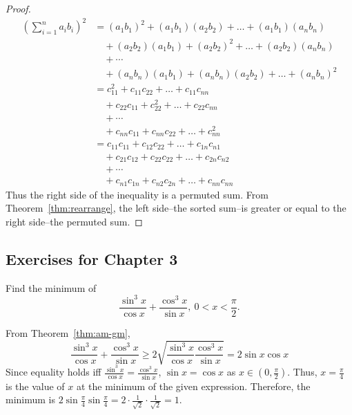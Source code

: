 \documentclass[../main.tex]{subfiles}
\begin{document}
\begin{proof}
    \begin{align*}
        \left( \sum_{i=1}^n a_i b_i\right)^2 &= (a_1 b_1)^2 + (a_1 b_1)(a_2 b_2) + \dots + (a_1 b_1)(a_n b_n)\\
                                             &\quad + (a_2 b_2)(a_1 b_1) + (a_2 b_2)^2 + \dots + (a_2 b_2)(a_n b_n)\\
                                             &\quad + \cdots\\
                                             &\quad + (a_n b_n)(a_1 b_1) + (a_n b_n)(a_2 b_2) + \dots + (a_n b_n)^2\\
                                             &= c_{11}^2 + c_{11} c_{22} + \dots + c_{11} c_{nn}\\
                                             &\quad + c_{22} c_{11} + c_{22}^2 + \dots + c_{22} c_{nn}\\
                                             &\quad + \cdots \\
                                             &\quad + c_{nn} c_{11} + c_{nn} c_{22} + \dots + c_{nn}^2\\
                                             &= c_{11} c_{11} + c_{12} c_{22} + \dots + c_{1n} c_{n1}\\
                                             &\quad + c_{21} c_{12} + c_{22} c_{22} + \dots + c_{2n} c_{n2}\\
                                             &\quad + \cdots\\
                                             &\quad + c_{n1} c_{1n} + c_{n2} c_{2n} + \dots + c_{nn} c_{nn}
    \end{align*}
    Thus the right side of the inequality is a permuted sum.
    From Theorem~\ref{thm:rearrange}, the left side--the sorted sum--is greater or equal to the right side--the permuted sum.
\end{proof}

\subsection{Exercises for Chapter 3}
\begin{exercise}
    Find the minimum of 
    \[
        \frac{\sin^3 x}{\cos x} + \frac{\cos^3 x}{\sin x},\ 0 < x < \frac \pi 2.
    \]
\end{exercise}
\begin{sol}
    From Theorem~\ref{thm:am-gm},
    \[
        \frac{\sin^3 x}{\cos x} + \frac{\cos^3 x}{\sin x} \geq 2 \sqrt{\frac{\sin^3 x}{\cos x} \frac{\cos^3 x}{\sin x}} = 2 \sin x \cos x
    \]
    Since equality holds iff $\frac{\sin^3 x}{\cos x} = \frac{\cos^3 x}{\sin x}$, $\sin x = \cos x$ as $x \in \left(0, \frac \pi 2\right)$.
    Thus, $x = \frac \pi 4$ is the value of $x$ at the minimum of the given expression.
    Therefore, the minimum is $2 \sin \frac \pi 4 \sin \frac \pi 4 = 2 \cdot \frac{1}{\sqrt 2} \cdot \frac{1}{\sqrt 2} = 1$.
\end{sol}
\end{document}

